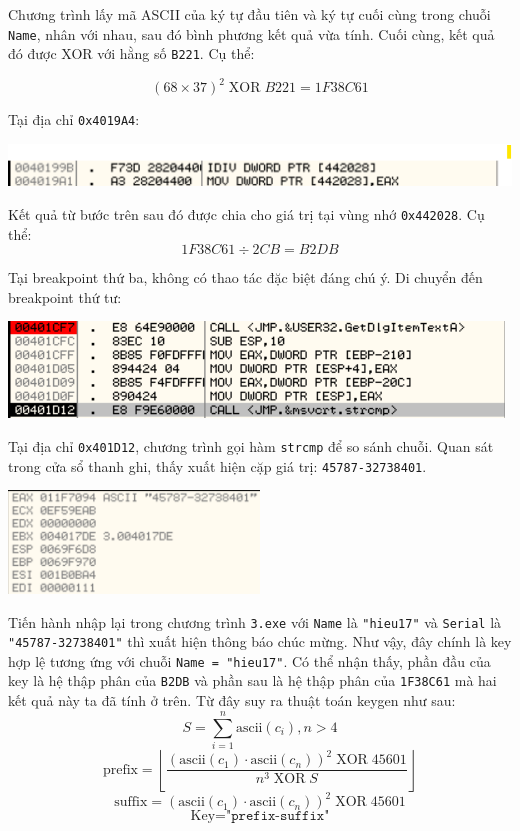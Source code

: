 Chương trình lấy mã ASCII của ký tự đầu tiên và ký tự cuối cùng trong chuỗi \texttt{Name}, nhân với nhau, sau đó bình phương kết quả vừa tính. Cuối cùng, kết quả đó được XOR với hằng số \texttt{B221}. Cụ thể:

\[
(68 \times 37)^2 \;\mathrm{XOR}\; B221 = 1F38C61
\]

Tại địa chỉ \texttt{0x4019A4}:

\begin{center}
    \includegraphics[width=\textwidth]{img/file-3/7.png}
\end{center}

Kết quả từ bước trên sau đó được chia cho giá trị tại vùng nhớ \texttt{0x442028}. Cụ thể: 
\[
    1F38C61 \div 2CB = B2DB
\] 

Tại breakpoint thứ ba, không có thao tác đặc biệt đáng chú ý. Di chuyển đến breakpoint thứ tư:

\begin{center}
    \includegraphics[width=\textwidth]{img/file-3/8.png}
\end{center}

Tại địa chỉ \texttt{0x401D12}, chương trình gọi hàm \texttt{strcmp} để so sánh chuỗi. Quan sát trong cửa sổ thanh ghi, thấy xuất hiện cặp giá trị: \texttt{45787-32738401}.

\begin{center}
    \includegraphics[width=0.5\textwidth]{img/file-3/9.png}
\end{center}

Tiến hành nhập lại trong chương trình \texttt{3.exe} với \texttt{Name} là \texttt{"hieu17"} và \texttt{Serial} là \texttt{"45787-32738401"} thì xuất hiện thông báo chúc mừng. Như vậy, đây chính là key hợp lệ tương ứng với chuỗi \texttt{Name = "hieu17"}.
Có thể nhận thấy, phần đầu của key là hệ thập phân của \texttt{B2DB} và phần sau là hệ thập phân của \texttt{1F38C61} mà hai kết quả này ta đã tính ở trên.
Từ đây suy ra thuật toán keygen như sau:
\[
S = \sum_{i=1}^{n} \mathrm{ascii}(c_i), n > 4
\]
\[
\text{prefix} = \left\lfloor \dfrac{ \left( \mathrm{ascii}(c_1) \cdot \mathrm{ascii}(c_n) \right)^2 \;\mathrm{XOR}\; 45601 }{ n^3 \;\mathrm{XOR}\; S } \right\rfloor
\]
\[
\text{suffix} = \left( \mathrm{ascii}(c_1) \cdot \mathrm{ascii}(c_n) \right)^2 \;\mathrm{XOR}\; 45601
\]
\[
\text{Key} = \text{"}\texttt{prefix} \text{-} \texttt{suffix}\text{"}
\]


